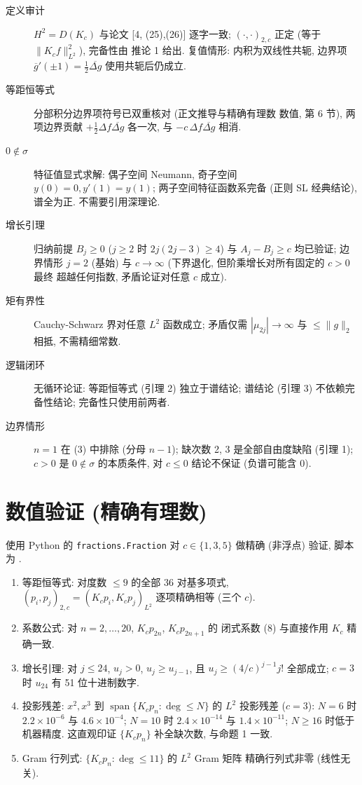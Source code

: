 \documentclass[UTF8]{ctexart}
\begin{document}
\begin{description}
	\item[定义审计] $H^2 = D(K_c)$ 与论文 [4, (25),(26)] 逐字一致;
		$(\cdot,\cdot)_{2,c}$ 正定 (等于 $\|K_c f\|_{L^2}^2$), 完备性由
		推论 1 给出. 复值情形: 内积为双线性共轭, 边界项
		$\overline{g}'(\pm1) = \tfrac12\overline{\Delta g}$ 使用共轭后仍成立.
	\item[等距恒等式] 分部积分边界项符号已双重核对 (正文推导与精确有理数
		数值, 第 6 节), 两项边界贡献 $+\tfrac12\Delta f\overline{\Delta g}$
		各一次, 与 $-c\,\Delta f\overline{\Delta g}$ 相消.
	\item[$0 \notin \sigma$] 特征值显式求解: 偶子空间 Neumann, 奇子空间
		$y(0)=0, y'(1)=y(1)$; 两子空间特征函数系完备 (正则 SL 经典结论),
		谱全为正. 不需要引用深理论.
	\item[增长引理] 归纳前提 $B_j \geq 0$ ($j \geq 2$ 时 $2j(2j-3) \geq 4$)
		与 $A_j - B_j \geq c$ 均已验证; 边界情形 $j = 2$ (基始) 与
		$c \to \infty$ (下界退化, 但阶乘增长对所有固定的 $c > 0$ 最终
		超越任何指数, 矛盾论证对任意 $c$ 成立).
	\item[矩有界性] Cauchy-Schwarz 界对任意 $L^2$ 函数成立; 矛盾仅需
		$|\mu_{2j}| \to \infty$ 与 $\leq \|g\|_2$ 相抵, 不需精细常数.
	\item[逻辑闭环] 无循环论证: 等距恒等式 (引理 2) 独立于谱结论;
		谱结论 (引理 3) 不依赖完备性结论; 完备性只使用前两者.
	\item[边界情形] $n = 1$ 在 (3) 中排除 (分母 $n-1$); 缺次数 2, 3
		是全部自由度缺陷 (引理 1); $c > 0$ 是 $0 \notin \sigma$ 的本质条件,
		对 $c \leq 0$ 结论不保证 (负谱可能含 0).
\end{description}

\section{数值验证 (精确有理数)}

使用 Python 的 \texttt{fractions.Fraction} 对 $c \in \{1, 3, 5\}$ 做精确
(非浮点) 验证, 脚本为 .

\begin{enumerate}
	\item 等距恒等式: 对度数 $\leq 9$ 的全部 $36$ 对基多项式,
		$(p_i, p_j)_{2,c} = (K_c p_i, K_c p_j)_{L^2}$ 逐项精确相等 (三个 $c$).
	\item 系数公式: 对 $n = 2, \dots, 20$, $K_c p_{2n}$, $K_c p_{2n+1}$ 的
		闭式系数 (8) 与直接作用 $K_c$ 精确一致.
	\item 增长引理: 对 $j \leq 24$, $u_j > 0$, $u_j \geq u_{j-1}$, 且
		$u_j \geq (4/c)^{j-1} j!$ 全部成立; $c = 3$ 时
		$u_{24}$ 有 51 位十进制数字.
	\item 投影残差: $x^2, x^3$ 到 $\operatorname{span}\{K_c p_n : \deg \leq N\}$
		的 $L^2$ 投影残差 ($c = 3$): $N = 6$ 时 $2.2\times10^{-6}$ 与
		$4.6\times10^{-4}$; $N = 10$ 时 $2.4\times10^{-14}$ 与
		$1.4\times10^{-11}$; $N \geq 16$ 时低于机器精度. 这直观印证
		$\{K_c p_n\}$ 补全缺次数, 与命题 1 一致.
	\item Gram 行列式: $\{K_c p_n : \deg \leq 11\}$ 的 $L^2$ Gram 矩阵
		精确行列式非零 (线性无关).
\end{enumerate}
\end{document}
